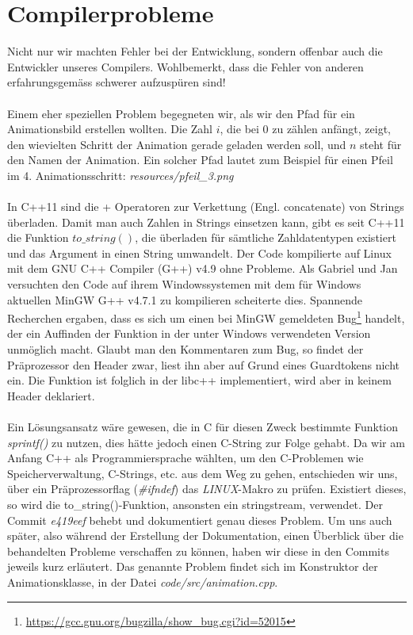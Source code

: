 \documentclass[11pt,a4paper]{scrbook}
\begin{document}
\section{Compilerprobleme}
Nicht nur wir machten Fehler bei der Entwicklung, sondern offenbar auch die Entwickler unseres Compilers. Wohlbemerkt, dass die Fehler von anderen erfahrungsgemäss schwerer aufzuspüren sind!\\
\\
Einem eher speziellen Problem begegneten wir, als wir den Pfad für ein Animationsbild erstellen wollten.
Die Zahl $i$, die bei 0 zu zählen anfängt, zeigt, den wievielten Schritt der Animation gerade geladen werden soll, und $n$ steht für den Namen der Animation.
Ein solcher Pfad lautet zum Beispiel für einen Pfeil im 4. Animationsschritt: \textit{resources/pfeil\_3.png}\\
\\
In C++11 sind die + Operatoren zur Verkettung (Engl. concatenate) von Strings überladen. Damit man auch Zahlen in Strings einsetzen
kann, gibt es seit C++11 die Funktion $to\_string()$, die überladen für sämtliche Zahldatentypen existiert und das Argument in einen String
umwandelt. Der Code kompilierte auf Linux mit dem GNU C++ Compiler (G++) v4.9 ohne Probleme. Als Gabriel und Jan versuchten den Code auf ihrem Windowssystemen
mit dem für Windows aktuellen MinGW G++ v4.7.1 zu kompilieren scheiterte dies. Spannende Recherchen ergaben, dass es sich um einen bei MinGW gemeldeten Bug\footnote{\url{https://gcc.gnu.org/bugzilla/show_bug.cgi?id=52015}} handelt, der ein Auffinden der Funktion in der unter Windows verwendeten
Version unmöglich macht. Glaubt man den Kommentaren zum Bug, so findet der Präprozessor den Header zwar, liest ihn aber auf Grund eines Guardtokens nicht ein.
Die Funktion ist folglich in der libc++ implementiert, wird aber in keinem Header deklariert.\\ %
\\
Ein Lösungsansatz wäre gewesen, die in C für diesen Zweck bestimmte Funktion \textit{sprintf()} zu nutzen, dies hätte jedoch einen C-String zur Folge gehabt.
Da wir am Anfang C++ als Programmiersprache wählten, um den C-Problemen wie Speicherverwaltung, C-Strings, etc. aus dem Weg zu gehen, entschieden wir uns, über ein
Präprozessorflag (\textit{\#ifndef}) das \textit{LINUX}-Makro zu prüfen. Existiert dieses, so wird die to\_string()-Funktion, ansonsten ein stringstream, verwendet.
Der Commit \textit{e419eef} behebt und dokumentiert genau dieses Problem. Um uns auch später, also während der Erstellung der Dokumentation, einen Überblick
über die behandelten Probleme verschaffen zu können, haben wir diese in den Commits jeweils kurz erläutert. Das genannte Problem findet sich im
Konstruktor der Animationsklasse, in der Datei \textit{code/src/animation.cpp}.
\end{document}
